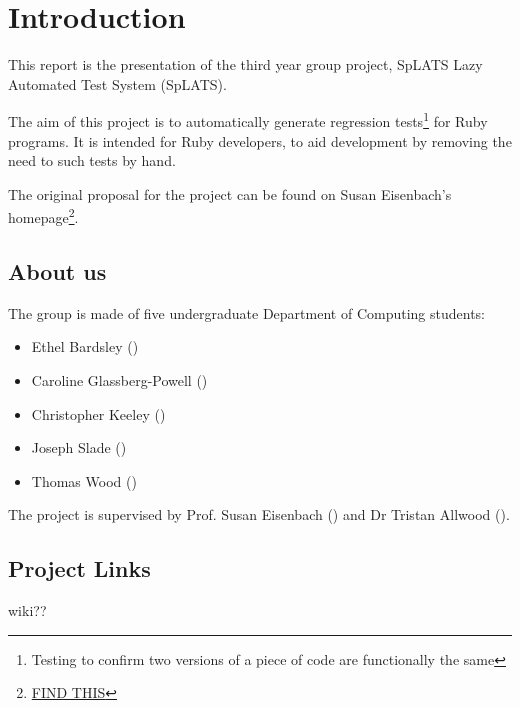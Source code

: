 \chapter{Introduction}

This report is the presentation of the third year group project, SpLATS Lazy Automated Test System (SpLATS).

The aim of this project is to automatically generate regression tests\footnote{Testing to confirm two versions of a piece of code are functionally the same} for Ruby programs.
It is intended for Ruby developers, to aid development by removing the need to such tests by hand.

The original proposal for the project can be found on Susan Eisenbach's homepage\footnote{\url{FIND THIS}}.

\section{About us}
  The group is made of five undergraduate Department of Computing students:
  \begin{itemize}
    \item{Ethel Bardsley ()}
    \item{Caroline Glassberg-Powell ()}
    \item{Christopher Keeley ()}
    \item{Joseph Slade ()}
    \item{Thomas Wood ()}
  \end{itemize}

  The project is supervised by Prof. Susan Eisenbach () and Dr Tristan Allwood ().

\section{Project Links}
  wiki??
